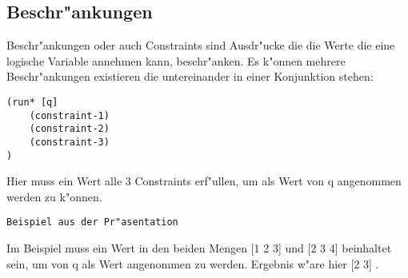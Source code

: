 \subsection{Beschr"ankungen}

Beschr"ankungen oder auch Constraints sind Ausdr"ucke die die Werte die eine logische Variable annehmen kann, beschr"anken. Es k"onnen mehrere Beschr"ankungen existieren die untereinander in einer Konjunktion stehen:
\begin{lstlisting}
(run* [q]
    (constraint-1)
    (constraint-2)
    (constraint-3)
)
\end{lstlisting}

Hier muss ein Wert alle 3 Constraints erf"ullen, um als Wert von q angenommen werden zu k"onnen.
\begin{lstlisting}
Beispiel aus der Pr"asentation
\end{lstlisting}

Im Beispiel muss ein Wert in den beiden Mengen [1 2 3] und [2 3 4] beinhaltet sein, um von q als Wert angenommen zu werden. Ergebnis w"are hier [2 3] .


